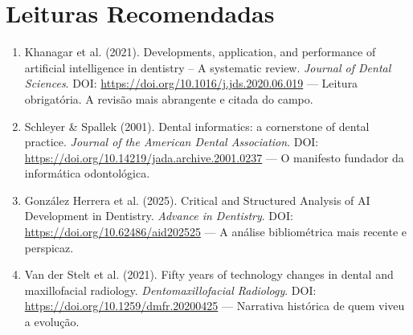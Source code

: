 \section{Leituras Recomendadas}

\begin{enumerate}
    \item Khanagar et al. (2021). Developments, application, and performance of artificial intelligence in dentistry – A systematic review. \textit{Journal of Dental Sciences}. DOI: \url{https://doi.org/10.1016/j.jds.2020.06.019} — Leitura obrigatória. A revisão mais abrangente e citada do campo.
    \item Schleyer \& Spallek (2001). Dental informatics: a cornerstone of dental practice. \textit{Journal of the American Dental Association}. DOI: \url{https://doi.org/10.14219/jada.archive.2001.0237} — O manifesto fundador da informática odontológica.
    \item González Herrera et al. (2025). Critical and Structured Analysis of AI Development in Dentistry. \textit{Advance in Dentistry}. DOI: \url{https://doi.org/10.62486/aid202525} — A análise bibliométrica mais recente e perspicaz.
    \item Van der Stelt et al. (2021). Fifty years of technology changes in dental and maxillofacial radiology. \textit{Dentomaxillofacial Radiology}. DOI: \url{https://doi.org/10.1259/dmfr.20200425} — Narrativa histórica de quem viveu a evolução.
\end{enumerate}

